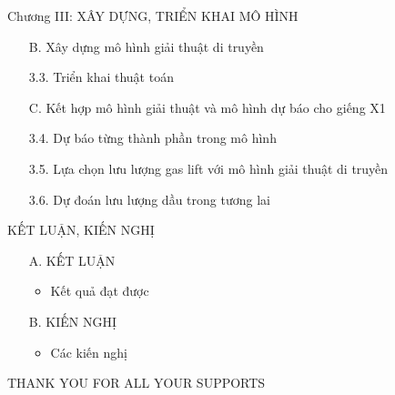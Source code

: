 \documentclass[xcolor=table, 11pt]{beamer}
\begin{document}
\begin{frame}{Chương III: XÂY DỰNG, TRIỂN KHAI MÔ HÌNH}
    \begin{itemize}
        \item[B. ] Xây dựng mô hình giải thuật di truyền
    \end{itemize}
    \begin{itemize}
        \item[3.3.] Triển khai thuật toán
    \end{itemize}
    \begin{itemize}
        \item[C. ] Kết hợp mô hình giải thuật và mô hình dự báo cho giếng X1
    \end{itemize}
    \begin{itemize}
        \item[3.4.] Dự báo từng thành phần trong mô hình
        \item[3.5.] Lựa chọn lưu lượng gas lift với mô hình giải thuật di truyền
        \item[3.6.] Dự đoán lưu lượng dầu trong tương lai
    \end{itemize}
\end{frame}

\begin{frame}{KẾT LUẬN, KIẾN NGHỊ}
    \begin{itemize}
        \item[A. ] KẾT LUẬN
            \begin{itemize}
                \item Kết quả đạt được
            \end{itemize}
        \item[B. ] KIẾN NGHỊ
            \begin{itemize}
                \item Các kiến nghị
            \end{itemize}
    \end{itemize}
\end{frame}

\begin{frame}{}
    \begin{center}
    THANK YOU FOR ALL YOUR SUPPORTS
    \end{center}
\end{frame}
\end{document}
